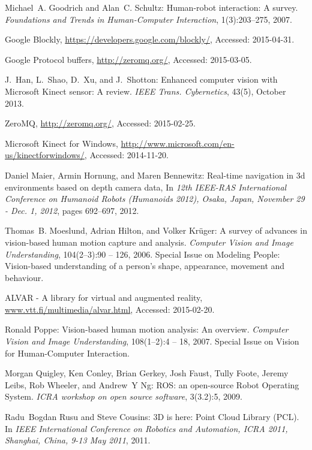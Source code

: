 \documentclass{llncs}
\begin{document}
\begin{thebibliography}{4}
Michael~A. Goodrich and Alan~C. Schultz: Human-robot interaction: {A} survey. {\em Foundations and Trends in Human-Computer Interaction}, 1(3):203--275, 2007.

Google Blockly, \url{https://developers.google.com/blockly/}, Accessed: 2015-04-31.

Google Protocol buffers, \url{http://zeromq.org/}, Accessed: 2015-03-05.

J.~Han, L.~Shao, D.~Xu, and J.~Shotton: Enhanced computer vision with Microsoft Kinect sensor: A review. {\em IEEE Trans. Cybernetics}, 43(5), October 2013.

ZeroMQ, \url{http://zeromq.org/}, Accessed: 2015-02-25.

Microsoft Kinect for Windows, \url{http://www.microsoft.com/en-us/kinectforwindows/}, Accessed: 2014-11-20.

Daniel Maier, Armin Hornung, and Maren Bennewitz: Real-time navigation in 3d environments based on depth camera data, In {\em 12th {IEEE-RAS} International Conference on Humanoid Robots (Humanoids 2012), Osaka, Japan, November 29 - Dec. 1, 2012}, pages 692--697, 2012.

Thomas~B. Moeslund, Adrian Hilton, and Volker Krüger: A survey of advances in vision-based human motion capture and analysis. {\em Computer Vision and Image Understanding}, 104(2–3):90 -- 126, 2006. Special Issue on Modeling People: Vision-based understanding of a person’s shape, appearance, movement and behaviour.

ALVAR - A library for virtual and augmented reality, \url{www.vtt.fi/multimedia/alvar.html}, Accessed: 2015-02-20.

Ronald Poppe: Vision-based human motion analysis: An overview. {\em Computer Vision and Image Understanding}, 108(1–2):4 -- 18, 2007. Special Issue on Vision for Human-Computer Interaction.

Morgan Quigley, Ken Conley, Brian Gerkey, Josh Faust, Tully Foote, Jeremy Leibs, Rob Wheeler, and Andrew~Y Ng: ROS: an open-source Robot Operating System. {\em ICRA workshop on open source software}, 3(3.2):5, 2009.

Radu~Bogdan Rusu and Steve Cousins: 3D is here: Point Cloud Library {(PCL)}. In {\em {IEEE} International Conference on Robotics and Automation, {ICRA} 2011, Shanghai, China, 9-13 May 2011}, 2011.


\end{thebibliography}
\end{document}
